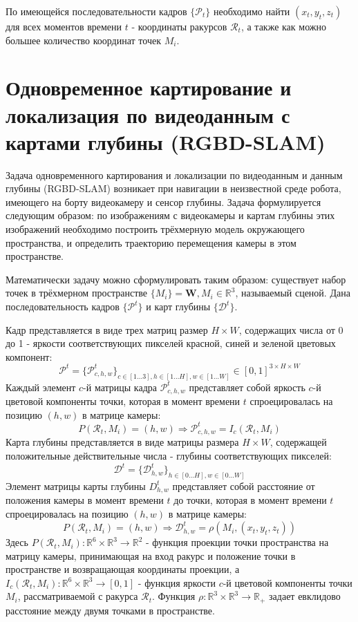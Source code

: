 \documentclass{mipt-thesis-ms}
\begin{document}
	По имеющейся последовательности кадров $\{\mathcal{P}_t\}$ необходимо найти $(x_t, y_t, z_t)$ для всех моментов времени $t$ - координаты ракурсов $\mathcal{R}_t$, а также как можно большее количество координат точек $M_i$.
	
	\section{Одновременное картирование и локализация по видеоданным с картами глубины (RGBD-SLAM)}
	
	Задача одновременного картирования и локализации по видеоданным и данным глубины (RGBD-SLAM) возникает при навигации в неизвестной среде робота, имеющего на борту видеокамеру и сенсор глубины. Задача формулируется следующим образом: по изображениям с видеокамеры и картам глубины этих изображений необходимо построить трёхмерную модель окружающего пространства, и определить траекторию перемещения камеры в этом пространстве.
	
	Математически задачу можно сформулировать таким образом: существует набор точек в трёхмерном пространстве $\{M_i \} = \textbf{W}, M_i \in \mathbb{R}^3$, называемый сценой. Дана последовательность кадров $\{\mathcal{P}^t\}$ и карт глубины $\{\mathcal{D}^t\}$.
	
	Кадр представляется в виде трех матриц размер $H \times W$, содержащих числа от 0 до 1 - яркости соответствующих пикселей красной, синей и зеленой цветовых компонент:
	$$\mathcal{P}^t = \{\mathcal{P}^t_{c,h,w}\}_{c \in [1 \dots 3], h \in [1 \dots H], w \in [1 \dots W]} \in [0, 1]^{3 \times H \times W}$$
	Каждый элемент $c$-й матрицы кадра $\mathcal{P}^t_{c,h,w}$ представляет собой яркость $c$-й цветовой компоненты точки, которая в момент времени $t$ спроецировалась на позицию $(h, w)$ в матрице камеры:
	$$P(\mathcal{R}_t, M_i) = (h, w) \Rightarrow \mathcal{P}^t_{c,h,w} = I_c(\mathcal{R}_t, M_i)$$
	Карта глубины представляется в виде матрицы размера $H \times W$, содержащей положительные действительные числа - глубины соответствующих пикселей:
	$$\mathcal{D}^t = \{\mathcal{D}^t_{h,w}\}_{h \in [0 \dots H], w \in [0 \dots W]}$$
	Элемент матрицы карты глубины $D^t_{h,w}$ представляет собой расстояние от положения камеры в момент времени $t$ до точки, которая в момент времени $t$ спроецировалась на позицию $(h, w)$ в матрице камеры: 
	$$P(\mathcal{R}_t, M_i) = (h, w) \Rightarrow \mathcal{D}^t_{h,w} = \rho(M_i, (x_t, y_t, z_t))$$
	Здесь $P(\mathcal{R}_t, M_i): \mathbb{R}^6 \times \mathbb{R}^3 \rightarrow \mathbb{R}^2$ - функция проекции точки пространства на матрицу камеры, принимающая на вход ракурс и положение точки в пространстве и возвращающая координаты проекции, а $I_c (\mathcal{R}_t, M_i): \mathbb{R}^6 \times \mathbb{R}^3 \rightarrow [0, 1]$ - функция яркости $c$-й цветовой компоненты точки $M_i$, рассматриваемой с ракурса $\mathcal{R}_t$. Функция $\rho: \mathbb{R}^3 \times \mathbb{R}^3 \rightarrow \mathbb{R}_{+}$ задает евклидово расстояние между двумя точками в пространстве.
	
\end{document}
